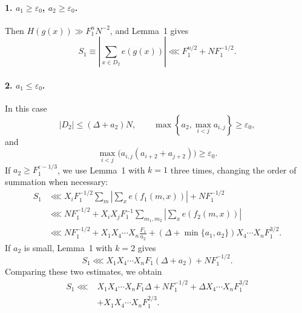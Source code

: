 \documentclass[10pt]{article}
\begin{document}
\paragraph{1. $a_1\geqslant\varepsilon_0$, $a_2\geqslant\varepsilon_0$.}
Then $H(g(x))\gg F_1^nN^{-2}$, and Lemma~1 gives
\[
  S_1\equiv\left|\sum_{x\in D_2}e(g(x))\right|
  \lll F_1^{n/2}+NF_1^{-1/2}.
\]

\paragraph{2. $a_1\leqslant\varepsilon_0$.}
In this case
\[
  |D_2|\leqslant(\Delta+a_2)N,
  \qquad \max\left\{a_2,\max_{i<j}a_{i,j}\right\}\geqslant\varepsilon_0,
\]
and
\[
  \max_{i<j}\bigl(a_{i,j}(a_{i+2}+a_{j+2})\bigr)\geqslant\varepsilon_0.
\]
If $a_2\geqslant F_1^{\varepsilon-1/3}$, we use Lemma~1 with $k=1$ three times, changing the order of summation when necessary:
\[
\begin{aligned}
  S_1
  &\lll X_iF_1^{-1/2}\sum_m
      \left|\sum_xe(f_1(m,x))\right|+NF_1^{-1/2}\\
  &\lll NF_1^{-1/2}+X_iX_jF_1^{-1}
      \sum_{m_1,m_2}\left|\sum_xe(f_2(m,x))\right|\\
  &\lll NF_1^{-1/2}
      +X_1X_4\cdots X_n\frac{F_1}{a_2}
      +(\Delta+\min\{a_1,a_2\})X_4\cdots X_nF_1^{3/2}.
\end{aligned}
\]
If $a_2$ is small, Lemma~1 with $k=2$ gives
\[
  S_1\lll X_1X_4\cdots X_nF_1(\Delta+a_2)+NF_1^{-1/2}.
\]
Comparing these two estimates, we obtain
\[
\begin{aligned}
  S_1\lll{}&X_1X_4\cdots X_nF_1\Delta+NF_1^{-1/2}
  +\Delta X_4\cdots X_nF_1^{3/2}\\
  &+X_1X_4\cdots X_nF_1^{2/3}.
\end{aligned}
\]
\end{document}
